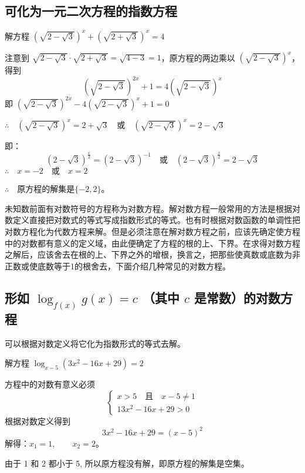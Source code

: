 \subsection{可化为一元二次方程的指数方程}

\begin{example}
解方程 $\left(\sqrt{2-\sqrt{3}}\right)^x+\left(\sqrt{2+\sqrt{3}}\right)^x=4$
\end{example}

\begin{solution}
注意到 $\sqrt{2-\sqrt{3}}\cdot \sqrt{2+\sqrt{3}}=\sqrt{4-3}=1$，原方程的两边乘以 $\left(\sqrt{2-\sqrt{3}}\right)^x$，得到
\[\left(\sqrt{2-\sqrt{3}}\right)^{2x}+1=4\left(\sqrt{2-\sqrt{3}}\right)^x\]
即
$\left(\sqrt{2-\sqrt{3}}\right)^{2x}-4\left(\sqrt{2-\sqrt{3}}\right)^x+1=0$

$\therefore\quad \left(\sqrt{2-\sqrt{3}}\right)^x=2+\sqrt{3}\quad \text{或}\quad \left(\sqrt{2-\sqrt{3}}\right)^x=2-\sqrt{3}$

即：
\[\left({2-\sqrt{3}}\right)^{\tfrac{x}{2}}=\left({2-\sqrt{3}}\right)^{-1}\quad \text{或}\quad \left({2-\sqrt{3}}\right)^{\tfrac{x}{2}}=2-\sqrt{3}\]
$\therefore\quad x=-2\quad \text{或}\quad x=2$

$\therefore\quad $原方程的解集是$\{-2,2\}$。
\end{solution}

未知数前面有对数符号的方程称为对数方程。解对数方程一般常用的方法是根据对数定义直接把对数式的等式写成指数形式的等式。也有时根据对数函数的单调性把对数方程化为代数方程来解。但是必须注意在解对数方程之前，应该先确定使方程中的对数都有意义的定义域，由此便确定了方程的根的上、下界。在求得对数方程之解后，应该舍去在根的上、下界之外的增根，换言之，把那些使真数或底数为非正数或使底数等于1的根舍去，下面介绍几种常见的对数方程。

\subsection{形如 $\log_{f(x)}g(x)=c$\; （其中 $c$ 是常数）的对数方程}

可以根据对数定义将它化为指数形式的等式去解。
\begin{example}
解方程 $\log_{x-5}(3x^2-16x+29)=2$
\end{example}

\begin{solution}
方程中的对数有意义必须
\[\begin{cases}
  x>5\quad\text{且}\quad  x-5\ne 1 \\
  13x^2-16x+29>0
\end{cases}\] 
根据对数定义得到
\[ 3x^2-16x+29=(x-5)^2\]
解得：$x_1=1,\qquad x_2=2$。

由于 1 和 2 都小于 5, 所以原方程没有解，即原方程的解集是空集。
\end{solution}

